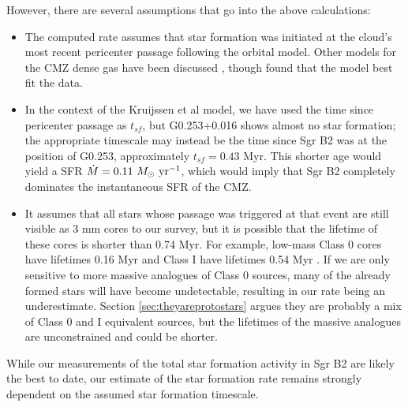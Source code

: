 \documentclass[twocolumn]{aastex61}
\begin{document}
However, there are several assumptions that go into the above calculations:
\begin{itemize}
    \item The computed rate assumes that star formation was initiated at the
        cloud's most recent pericenter passage following the
        \citet{Kruijssen2015a} orbital model.  Other models for the CMZ
        dense gas have been discussed
        \citep[e.g.,][]{Molinari2011a,Sofue2017b,Ridley2017a,Sormani2017a},
        though \citet{Henshaw2016a} found that the \citet{Kruijssen2015a} model
        best fit the data.
    \item In the context of the Kruijssen et al model, we have used the time
        since pericenter passage as $t_{sf}$, but G0.253+0.016 shows almost no
        star formation; the appropriate timescale may instead be the time since
        Sgr B2 was at the position of G0.253, approximately $t_{sf}=0.43$ Myr.
        This shorter age would yield a SFR
        ${\dot{M}=0.11~M_{\odot}~\textrm{yr}^{-1}}$, which would imply that Sgr
        B2 completely dominates the instantaneous SFR of the CMZ.
    \item It  assumes that all stars whose passage was triggered at that event
        are still visible as 3 mm cores to our survey, but it is possible that
        the lifetime of these cores is shorter than 0.74 Myr.  For example,
        low-mass Class 0 cores have lifetimes 0.16 Myr and Class I have
        lifetimes 0.54 Myr \citep{Evans2009a}.  If we are only sensitive to 
        more massive analogues of Class 0 sources, many of the already formed
        stars will have become undetectable, resulting in our rate being
        an underestimate.  Section \ref{sec:theyareprotostars} argues
        they are probably a mix of Class 0 and I equivalent sources,
        but the lifetimes of the massive analogues are unconstrained
        and could be shorter.
\end{itemize}

While our measurements of the total star formation activity in Sgr B2 are
likely the best to date, our estimate of the star formation rate remains
strongly dependent on the assumed star formation timescale.


% 
\end{document}
